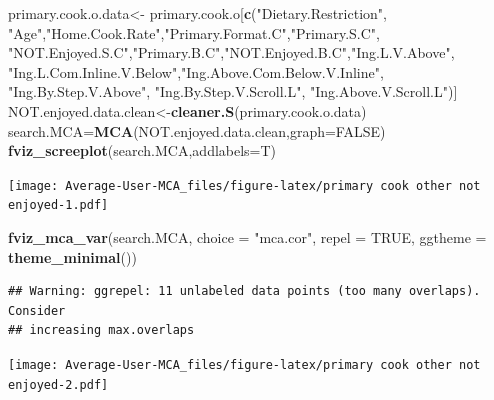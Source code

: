 \documentclass[
]{article}
\newenvironment{Shaded}{\begin{snugshade}}{\end{snugshade}}
\newcommand{\DataTypeTok}[1]{\textcolor[rgb]{0.13,0.29,0.53}{#1}}
\newcommand{\KeywordTok}[1]{\textcolor[rgb]{0.13,0.29,0.53}{\textbf{#1}}}
\newcommand{\NormalTok}[1]{#1}
\newcommand{\OtherTok}[1]{\textcolor[rgb]{0.56,0.35,0.01}{#1}}
\newcommand{\StringTok}[1]{\textcolor[rgb]{0.31,0.60,0.02}{#1}}
\begin{document}
\begin{Shaded}
\begin{Highlighting}[]
\NormalTok{primary.cook.o.data<-}\StringTok{ }\NormalTok{primary.cook.o[}\KeywordTok{c}\NormalTok{(}\StringTok{"Dietary.Restriction"}\NormalTok{, }\StringTok{"Age"}\NormalTok{,}\StringTok{"Home.Cook.Rate"}\NormalTok{,}\StringTok{"Primary.Format.C"}\NormalTok{,}\StringTok{"Primary.S.C"}\NormalTok{,}
            \StringTok{"NOT.Enjoyed.S.C"}\NormalTok{,}\StringTok{"Primary.B.C"}\NormalTok{,}\StringTok{"NOT.Enjoyed.B.C"}\NormalTok{,}\StringTok{"Ing.L.V.Above"}\NormalTok{,}
            \StringTok{"Ing.L.Com.Inline.V.Below"}\NormalTok{,}\StringTok{"Ing.Above.Com.Below.V.Inline"}\NormalTok{,  }\StringTok{"Ing.By.Step.V.Above"}\NormalTok{,  }\StringTok{"Ing.By.Step.V.Scroll.L"}\NormalTok{,}
            \StringTok{"Ing.Above.V.Scroll.L"}\NormalTok{)]}
\NormalTok{NOT.enjoyed.data.clean<-}\KeywordTok{cleaner.S}\NormalTok{(primary.cook.o.data)}
\NormalTok{search.MCA=}\KeywordTok{MCA}\NormalTok{(NOT.enjoyed.data.clean,}\DataTypeTok{graph=}\OtherTok{FALSE}\NormalTok{)}
\KeywordTok{fviz_screeplot}\NormalTok{(search.MCA,}\DataTypeTok{addlabels=}\NormalTok{T)}
\end{Highlighting}
\end{Shaded}

\texttt{[image: Average-User-MCA\_files/figure-latex/primary cook other not enjoyed-1.pdf]}

\begin{Shaded}
\begin{Highlighting}[]
\KeywordTok{fviz_mca_var}\NormalTok{(search.MCA, }\DataTypeTok{choice =} \StringTok{"mca.cor"}\NormalTok{, }\DataTypeTok{repel =} \OtherTok{TRUE}\NormalTok{,}
             \DataTypeTok{ggtheme =} \KeywordTok{theme_minimal}\NormalTok{())}
\end{Highlighting}
\end{Shaded}

\begin{verbatim}
## Warning: ggrepel: 11 unlabeled data points (too many overlaps). Consider
## increasing max.overlaps
\end{verbatim}

\texttt{[image: Average-User-MCA\_files/figure-latex/primary cook other not enjoyed-2.pdf]}

\begin{Shaded}
\end{Shaded}
\end{document}
